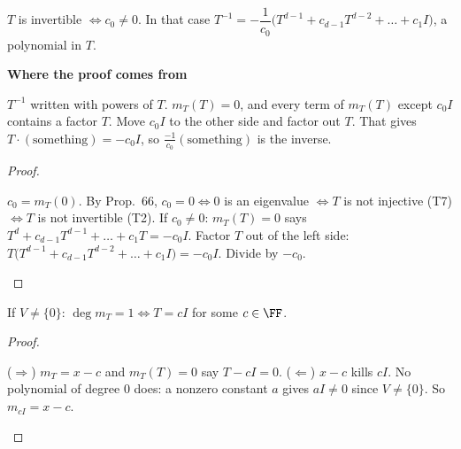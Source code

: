 \documentclass[10pt]{scrartcl}
\newenvironment{motive}{\begin{mdframed}[style=thinkbox]\textbf{\color{OliveGreen!75!black}Where the proof comes from}\begin{description}[leftmargin=0.9em,labelindent=0pt,itemsep=2pt,topsep=2pt,font=\normalfont\bfseries\color{OliveGreen!70!black}]}{\end{description}\end{mdframed}}
\newenvironment{steps}{\begin{enumerate}[label=\arabic*.,leftmargin=1.5em,itemsep=2pt,topsep=2pt]}{\end{enumerate}}
\begin{document}
\begin{proposition*}[F1: invertibility, HW7 P3]
  $T$ is invertible $\iff c_0\ne0$. In that case $T^{-1}=-\dfrac1{c_0}\bigl(T^{d-1}+c_{d-1}T^{d-2}+\dots+c_1I\bigr)$, a polynomial in $T$.
\end{proposition*}
\begin{motive}
  \ii[Want.] $T^{-1}$ written with powers of $T$.
  \ii[Know.] $m_T(T)=0$, and every term of $m_T(T)$ except $c_0I$ contains a factor $T$.
   Move $c_0I$ to the other side and factor out $T$. That gives $T\cdot(\text{something})=-c_0I$, so $\frac{-1}{c_0}(\text{something})$ is the inverse.
\end{motive}
\begin{proof}
  \begin{steps}
    \ii $c_0=m_T(0)$. By Prop.~66, $c_0=0\iff0$ is an eigenvalue $\iff T$ is not injective (T7) $\iff T$ is not invertible (T2).
    \ii If $c_0\ne0$: $m_T(T)=0$ says $T^d+c_{d-1}T^{d-1}+\dots+c_1T=-c_0I$.
    \ii Factor $T$ out of the left side: $T\bigl(T^{d-1}+c_{d-1}T^{d-2}+\dots+c_1I\bigr)=-c_0I$. Divide by $-c_0$.
  \end{steps}
\end{proof}

\begin{proposition*}
  If $V\ne\{0\}$: $\deg m_T=1\iff T=cI$ for some $c\in\FF$.
\end{proposition*}
\begin{proof}
  \begin{steps}
    \ii ($\Rightarrow$) $m_T=x-c$ and $m_T(T)=0$ say $T-cI=0$.
    \ii ($\Leftarrow$) $x-c$ kills $cI$. No polynomial of degree $0$ does: a nonzero constant $a$ gives $aI\ne0$ since $V\ne\{0\}$. So $m_{cI}=x-c$.
  \end{steps}
\end{proof}
\end{document}

